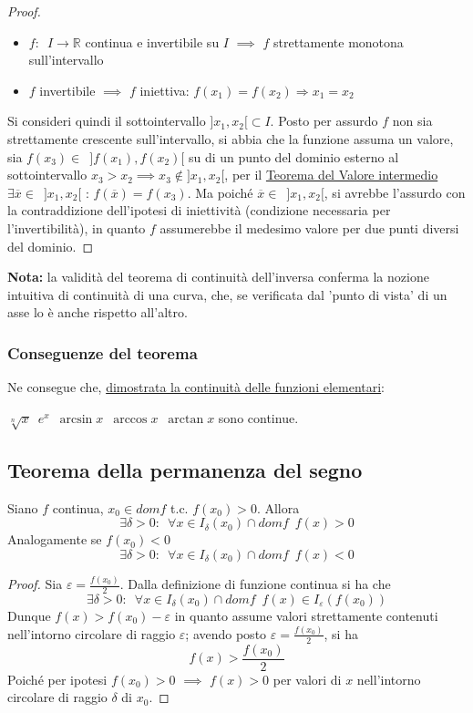 \documentclass[10pt, oneside]{book}
\theoremstyle{plain}
\begin{document}
\begin{proof}
\begin{itemize}[label=$\cdot$]
    \item  $f: \enspace I \rightarrow \mathbb{R}$ continua e invertibile su $I$ $\implies$ $f$ strettamente monotona sull'intervallo
    \item $f$ invertibile $\implies$ $f$ iniettiva: $f(x_1) = f(x_2) \Rightarrow x_1 = x_2$
\end{itemize} 
Si consideri quindi il sottointervallo $]x_1, x_2[ \subset I$. Posto per assurdo $f$ non sia strettamente crescente sull'intervallo, si abbia che la funzione assuma un valore, sia $f(x_3) \in \enspace ]f(x_1), f(x_2)[$ su di un punto del dominio esterno al sottointervallo $x_3 > x_2 \implies x_3 \notin ]x_1, x_2[$, per il \hyperlink{valint}{Teorema del Valore intermedio} $\exists \overline{x} \in \enspace ]x_1, x_2[$ : $f(\overline{x}) = f(x_3)$. Ma poiché $\overline{x} \in \enspace ]x_1, x_2[$, si avrebbe l'assurdo con la contraddizione dell'ipotesi di iniettività (condizione necessaria per l'invertibilità), in quanto $f$ assumerebbe il medesimo valore per due punti diversi del dominio.
\end{proof}
\textbf{Nota:} la validità del teorema di continuità dell'inversa conferma la nozione intuitiva di continuità di una curva, che, se verificata dal 'punto di vista' di un asse lo è anche rispetto all'altro.

\subsubsection{Conseguenze del teorema}
Ne consegue che, \hyperlink{elementarii}{dimostrata la continuità delle funzioni elementari}:\\ \begin{center}$\sqrt[n]{x} \enspace e^x \enspace \arcsin{x} \enspace \arccos{x} \enspace \arctan{x}$ \quad sono continue.\end{center}

\subsection{Teorema della permanenza del segno}
\label{subsubsec:perman}
\begin{ther}[\textbf{T. p. s.}]
Siano $f$ continua, $x_0 \in dom f$ t.c. $f(x_0) > 0$. Allora
\[\exists \delta > 0 : \enspace \forall x \in I_{\delta}(x_0) \cap dom f \enspace f(x) > 0\]
Analogamente se $f(x_0) < 0$
\[\exists \delta > 0 : \enspace \forall x \in I_{\delta}(x_0) \cap dom f \enspace f(x) < 0\]
\end{ther}
\begin{proof}
Sia $\displaystyle \varepsilon = \frac{f(x_0)}{2}$. Dalla definizione di funzione continua si ha che 
\[\exists \delta > 0 : \enspace \forall x \in I_{\delta}(x_0) \cap dom f \enspace f(x) \in I_{\varepsilon}(f(x_0))\]
Dunque $f(x) > f(x_0) - \varepsilon$ in quanto assume valori strettamente contenuti nell'intorno circolare di raggio $\varepsilon$; avendo posto $\varepsilon = \frac{f(x_0)}{2}$, si ha \[f(x) > \frac{f(x_0)}{2}\] Poiché per ipotesi $f(x_0) > 0$ $\implies$ $f(x) > 0$ per valori di $x$ nell'intorno circolare di raggio $\delta$ di $x_0$.
\end{proof}
\end{document}
